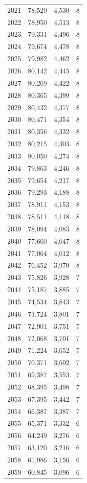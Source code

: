 \documentclass[11pt]{article}
\begin{document}
\begin{longtable}{@{}lrrr@{}}
2021 & 78,529 & 4,530 & 8\\
2022 & 78,950 & 4,513 & 8\\
2023 & 79,331 & 4,496 & 8\\
2024 & 79,674 & 4,478 & 8\\
2025 & 79,982 & 4,462 & 8\\
2026 & 80,142 & 4,445 & 8\\
2027 & 80,269 & 4,422 & 8\\
2028 & 80,365 & 4,399 & 8\\
2029 & 80,432 & 4,377 & 8\\
2030 & 80,471 & 4,354 & 8\\
2031 & 80,356 & 4,332 & 8\\
2032 & 80,215 & 4,303 & 8\\
2033 & 80,050 & 4,274 & 8\\
2034 & 79,863 & 4,246 & 8\\
2035 & 79,654 & 4,217 & 8\\
2036 & 79,293 & 4,188 & 8\\
2037 & 78,911 & 4,153 & 8\\
2038 & 78,511 & 4,118 & 8\\
2039 & 78,094 & 4,083 & 8\\
2040 & 77,660 & 4,047 & 8\\
2041 & 77,064 & 4,012 & 8\\
2042 & 76,452 & 3,970 & 8\\
2043 & 75,826 & 3,928 & 7\\
2044 & 75,187 & 3,885 & 7\\
2045 & 74,534 & 3,843 & 7\\
2046 & 73,724 & 3,801 & 7\\
2047 & 72,901 & 3,751 & 7\\
2048 & 72,068 & 3,701 & 7\\
2049 & 71,224 & 3,652 & 7\\
2050 & 70,371 & 3,602 & 7\\
2051 & 69,387 & 3,553 & 7\\
2052 & 68,395 & 3,498 & 7\\
2053 & 67,395 & 3,442 & 7\\
2054 & 66,387 & 3,387 & 7\\
2055 & 65,371 & 3,332 & 6\\
2056 & 64,249 & 3,276 & 6\\
2057 & 63,120 & 3,216 & 6\\
2058 & 61,986 & 3,156 & 6\\
2059 & 60,845 & 3,096 & 6\\

\end{longtable}
\end{document}
